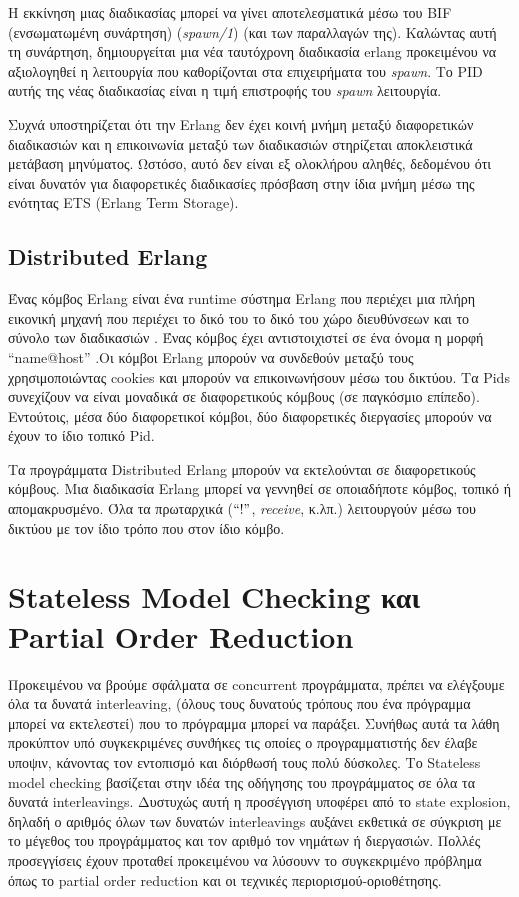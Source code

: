 Η εκκίνηση μιας διαδικασίας μπορεί να γίνει αποτελεσματικά μέσω του BIF (ενσωματωμένη συνάρτηση) (\textit{spawn/1})
(και των παραλλαγών της).
Καλώντας αυτή τη συνάρτηση, δημιουργείται μια νέα ταυτόχρονη διαδικασία erlang προκειμένου να αξιολογηθεί η λειτουργία
που καθορίζονται στα επιχειρήματα του \textit{spawn}. Το PID αυτής της νέας διαδικασίας είναι η τιμή επιστροφής του \textit{spawn}
λειτουργία.

Συχνά υποστηρίζεται ότι την Erlang δεν έχει κοινή μνήμη μεταξύ διαφορετικών διαδικασιών \cite{Armstrong:2007:PES:1403889}
και η επικοινωνία μεταξύ των διαδικασιών στηρίζεται αποκλειστικά
μετάβαση μηνύματος. Ωστόσο, αυτό δεν είναι εξ ολοκλήρου αληθές, δεδομένου ότι είναι δυνατόν για διαφορετικές διαδικασίες
πρόσβαση στην ίδια μνήμη μέσω της ενότητας ETS (Erlang Term Storage).

\subsection{Distributed Erlang}

Ένας κόμβος Erlang είναι ένα runtime σύστημα Erlang που περιέχει μια πλήρη εικονική μηχανή που περιέχει το δικό του
το δικό του χώρο διευθύνσεων και το σύνολο των διαδικασιών \cite{Armstrong:2007:PES:1403889}. Ένας κόμβος έχει αντιστοιχιστεί σε ένα όνομα
η μορφή ``name@host'' .Οι κόμβοι Erlang μπορούν να συνδεθούν μεταξύ τους χρησιμοποιώντας cookies και μπορούν να επικοινωνήσουν
μέσω του δικτύου. Τα Pids συνεχίζουν να είναι μοναδικά σε διαφορετικούς κόμβους (σε παγκόσμιο επίπεδο). Εντούτοις, μέσα
δύο διαφορετικοί κόμβοι, δύο διαφορετικές διεργασίες μπορούν να έχουν το ίδιο τοπικό Pid.

Τα προγράμματα Distributed Erlang μπορούν να εκτελούνται σε διαφορετικούς κόμβους. Μια διαδικασία Erlang μπορεί να γεννηθεί σε οποιαδήποτε
κόμβος, τοπικό ή απομακρυσμένο. Όλα τα πρωταρχικά ($``!"$, \textit{receive}, κ.λπ.) λειτουργούν μέσω του δικτύου με τον ίδιο τρόπο που
στον ίδιο κόμβο.

\section{Stateless Model Checking και Partial Order Reduction}

Προκειμένου να βρούμε σφάλματα σε  concurrent προγράμματα, πρέπει να ελέγξουμε όλα τα δυνατά interleaving, (όλους τους δυνατούς τρόπους που ένα πρόγραμμα μπορεί να εκτελεστεί)
που το πρόγραμμα μπορεί να παράξει. Συνήθως αυτά τα λάθη προκύπτον υπό συγκεκριμένες συνϑήκες τις οποίες ο προγραμματιστής δεν έλαβε υποψιν, κάνοντας τον εντοπισμό και
διόρθωσή τους πολύ δύσκολες.
Το Stateless model checking βασίζεται στην ιδέα της οδήγησης του προγράμματος σε όλα τα δυνατά interleavings. Δυστυχώς αυτή η προσέγγιση υποφέρει από το state explosion,
δηλαδή ο αριθμός όλων των δυνατών interleavings αυξάνει εκθετικά σε σύγκριση με το μέγεθος του προγράμματος και τον αριθμό τον νημάτων ή διεργασιών.
Πολλές προσεγγίσεις έχουν προταθεί προκειμένου να λύσουνν το συγκεκριμένο πρόβλημα όπως το partial order reduction \cite{Godefroid1996} και οι τεχνικές περιορισμού-οριοθέτησης. 

